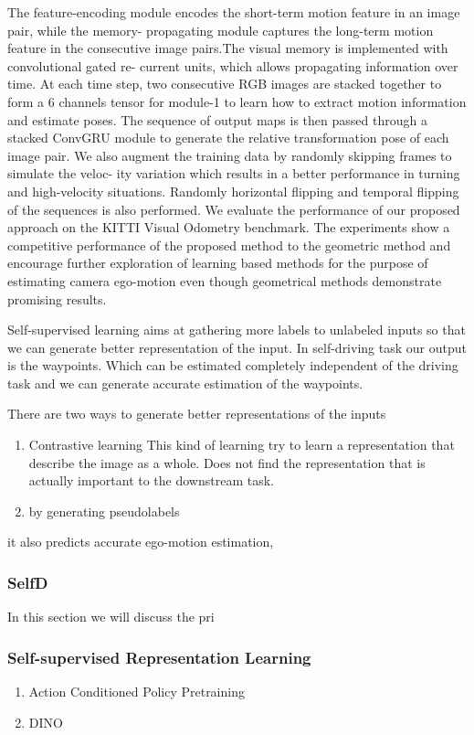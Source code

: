 \documentclass[letterpaper, 12pt]{article}
\theoremstyle{definition}
\theoremstyle{definition}
\theoremstyle{definition}
\theoremstyle{definition}
\theoremstyle{definition}
\begin{document}
The feature-encoding module
encodes the short-term motion feature in an image pair, while the memory-
propagating module captures the long-term motion feature in the consecutive
image pairs.The visual memory is implemented with convolutional gated re-
current units, which allows propagating information over time. At each time
step, two consecutive RGB images are stacked together to form a 6 channels
tensor for module-1 to learn how to extract motion information and estimate
poses. The sequence of output maps is then passed through a stacked ConvGRU module to generate the relative transformation pose of each image pair. We also
augment the training data by randomly skipping frames to simulate the veloc-
ity variation which results in a better performance in turning and high-velocity
situations. Randomly horizontal flipping and temporal flipping of the sequences
is also performed. We evaluate the performance of our proposed approach on
the KITTI Visual Odometry benchmark. The experiments show a competitive
performance of the proposed method to the geometric method and encourage
further exploration of learning based methods for the purpose of estimating
camera ego-motion even though geometrical methods demonstrate promising
results.


Self-supervised learning aims at gathering more labels to unlabeled inputs so
that we can generate better representation of the input. In self-driving task
our output is the waypoints. Which can be estimated completely independent of
the driving task and we can generate accurate estimation of the waypoints.

There are two ways to generate better representations of the inputs
\begin{enumerate}
\item Contrastive learning
This kind of learning try to learn a representation that describe the image
as a whole. Does not find the representation that is actually important to
the downstream task.
\item by generating pseudolabels
\end{enumerate}


it also predicts
accurate ego-motion estimation, 
\subsubsection{SelfD}
\label{sec:orgdcd8b7f}
In this section we will discuss the pri
\subsubsection{Self-supervised Representation Learning}
\label{sec:org2eb2d5d}
\begin{enumerate}
\item Action Conditioned Policy Pretraining
\label{sec:org43c17fb}
\item DINO
\label{sec:org28e5a04}
\end{enumerate}
\end{document}

